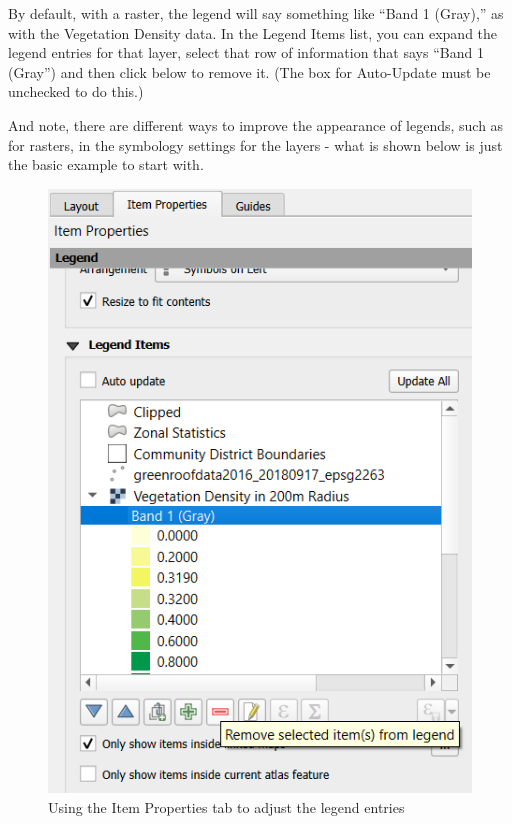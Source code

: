 \documentclass[
  letterpaper,
  DIV=11,
  numbers=noendperiod]{scrreprt}
\begin{document}
By default, with a raster, the legend will say something like ``Band 1
(Gray),'' as with the Vegetation Density data. In the Legend Items list,
you can expand the legend entries for that layer, select that row of
information that says ``Band 1 (Gray'') and then click
 below to remove
it. (The box for Auto-Update must be unchecked to do this.)

And note, there are different ways to improve the appearance of legends,
such as for rasters, in the symbology settings for the layers - what is
shown below is just the basic example to start with.

\begin{figure}

{\centering \includegraphics{./images/legend_edit.png}

}

\caption{Using the Item Properties tab to adjust the legend entries}

\end{figure}
\end{document}
